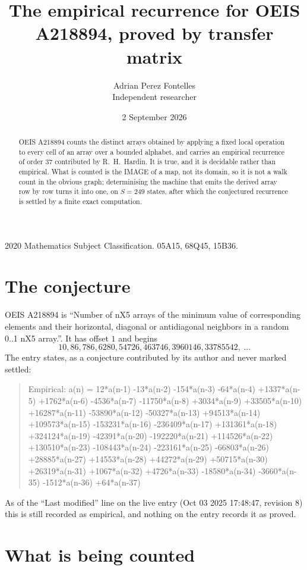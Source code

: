 \documentclass[11pt,a4paper]{article}
\title{The empirical recurrence for OEIS A218894, proved by transfer matrix}
\author{Adrian Perez Fontelles\\ \small Independent researcher}
\date{2 September 2026}
\theoremstyle{plain}
\theoremstyle{definition}
\begin{document}
\maketitle

\begin{abstract}
OEIS A218894 counts the distinct arrays obtained by applying a fixed local operation to every cell
of an array over a bounded alphabet, and carries an empirical recurrence of order $37$
contributed by R.~H.~Hardin. It is true, and it is decidable rather than empirical. What is
counted is the IMAGE of a map, not its domain, so it is not a walk count in the obvious graph;
determinising the machine that emits the derived array row by row turns it into one, on
$S=249$ states, after which the conjectured recurrence is settled by a finite exact
computation.
\end{abstract}

\noindent\small 2020 Mathematics Subject Classification. 05A15, 68Q45, 15B36.\normalsize

\section{The conjecture}

OEIS A218894 is ``Number of nX5 arrays of the minimum value of corresponding elements and their horizontal, diagonal or antidiagonal neighbors in a random 0..1 nX5 array.''. It has offset $1$ and begins
\[
10, 86, 786, 6280, 54726, 463746, 3960146, 33785542,\ \dots
\]
The entry states, as a conjecture contributed by its author and never marked settled:
\begin{quote}
Empirical: a(n) = 12*a(n-1) -13*a(n-2) -154*a(n-3) -64*a(n-4) +1337*a(n-5) +1762*a(n-6) -4536*a(n-7) -11750*a(n-8) +3034*a(n-9) +33505*a(n-10) +16287*a(n-11) -53890*a(n-12) -50327*a(n-13) +94513*a(n-14) +109573*a(n-15) -153231*a(n-16) -236409*a(n-17) +131361*a(n-18) +324124*a(n-19) -42391*a(n-20) -192220*a(n-21) +114526*a(n-22) +130510*a(n-23) -108443*a(n-24) -223161*a(n-25) -66803*a(n-26) +28885*a(n-27) +14553*a(n-28) +44272*a(n-29) +50715*a(n-30) +26319*a(n-31) +1067*a(n-32) +4726*a(n-33) -18580*a(n-34) -3660*a(n-35) -1512*a(n-36) +64*a(n-37)
\end{quote}
As of the ``Last modified'' line on the live entry (Oct 03 2025 17:48:47, revision 8) this is still
recorded as empirical, and nothing on the entry records it as proved.

\section{What is being counted}
\end{document}
